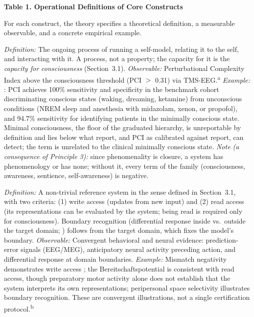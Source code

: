 \documentclass[12pt]{article}
\begin{document}
\noindent\textbf{Table 1. Operational Definitions of Core Constructs}

\medskip
\noindent For each construct, the theory specifies a theoretical definition, a measurable observable, and a concrete empirical example.

\begin{description}[leftmargin=0pt,labelindent=0pt,itemsep=0.8em]

\item[\textsc{Consciousness}] \emph{Definition:} The ongoing process of running a self-model, relating it to the self, and interacting with it. A process, not a property; the capacity for it is the \emph{capacity for consciousness} (Section~3.1). \emph{Observable:} Perturbational Complexity Index above the consciousness threshold (PCI $>$ 0.31) via TMS-EEG.\textsuperscript{a} \emph{Example:} \citet{Casarotto2016}: PCI achieves 100\% sensitivity and specificity in the benchmark cohort discriminating conscious states (waking, dreaming, ketamine) from unconscious conditions (NREM sleep and anesthesia with midazolam, xenon, or propofol), and 94.7\% sensitivity for identifying patients in the minimally conscious state. Minimal consciousness, the floor of the graduated hierarchy, is unreportable by definition and lies below what report, and PCI as calibrated against report, can detect; the term is unrelated to the clinical minimally conscious state. \emph{Note (a consequence of Principle 3):} since phenomenality is closure, a system has phenomenology or has none; without it, every term of the family (consciousness, awareness, sentience, self-awareness) is negative.

\item[\textsc{Model}] \emph{Definition:} A non-trivial reference system in the sense defined in Section~3.1, with two criteria: (1) write access (updates from new input) and (2) read access (its representations can be evaluated by the system; being read is required only for consciousness). Boundary recognition (differential response inside vs.\ outside the target domain; \citealp{Gruber2015}) follows from the target domain, which fixes the model's boundary. \emph{Observable:} Convergent behavioral and neural evidence: prediction-error signals (EEG/MEG), anticipatory neural activity preceding action, and differential response at domain boundaries. \emph{Example:} Mismatch negativity demonstrates write access \citep{Naatanen2007}; the Bereitschaftspotential is consistent with read access, though preparatory motor activity alone does not establish that the system interprets its own representations; peripersonal space selectivity illustrates boundary recognition. These are convergent illustrations, not a single certification protocol.\textsuperscript{b}


\end{description}
\end{document}
